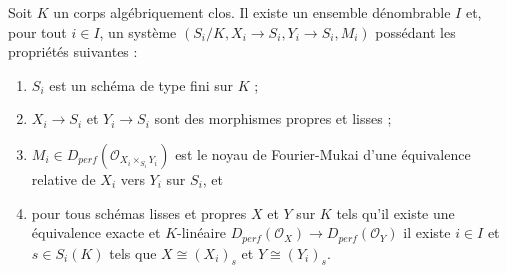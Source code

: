 \begin{lemma}
\label{lemma-countable-equivs}
Soit $K$ un corps algébriquement clos. Il existe un ensemble dénombrable $I$
et, pour tout $i \in I$, un système $(S_i/K, X_i \to S_i, Y_i \to S_i, M_i)$
possédant les propriétés suivantes :
\begin{enumerate}
\item $S_i$ est un schéma de type fini sur $K$ ;
\item $X_i \to S_i$ et $Y_i \to S_i$ sont des morphismes
propres et lisses ;
\item $M_i \in D_{perf}(\mathcal{O}_{X_i \times_{S_i} Y_i})$
est le noyau de Fourier-Mukai d'une équivalence relative de
$X_i$ vers $Y_i$ sur $S_i$, et
\item pour tous schémas lisses et propres $X$ et $Y$ sur $K$
tels qu'il existe une équivalence exacte et $K$-linéaire
$D_{perf}(\mathcal{O}_X) \to D_{perf}(\mathcal{O}_Y)$
il existe $i \in I$ et $s \in S_i(K)$
tels que $X \cong (X_i)_s$ et $Y \cong (Y_i)_s$.
\end{enumerate}
\end{lemma}

